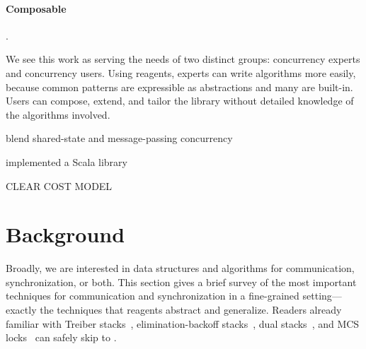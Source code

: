 \documentclass[preprint]{sigplanconf}
\begin{document}
\paragraph{Composable} .

We see this work as serving the needs of two distinct groups: concurrency
experts and concurrency users.  Using reagents, experts can write algorithms
more easily, because common patterns are expressible as abstractions and many
are built-in.  Users can compose, extend, and tailor the library without
detailed knowledge of the algorithms involved.

blend shared-state and message-passing concurrency

implemented a Scala library

CLEAR COST MODEL


\section{Background}
\label{sec:background}

\cite{Shavit1997a} %

Broadly, we are interested in data structures and algorithms for
communication, synchronization, or both.  This section gives a brief survey of
the most important techniques for communication and synchronization in a
fine-grained setting---exactly the techniques that reagents abstract and
generalize.  Readers already familiar with Treiber stacks~\cite{Treiber1986},
elimination-backoff stacks~\cite{Hendler2004}, dual stacks~\cite{Scherer2004},
and MCS locks~\cite{Mellor-Crummey1991} can safely skip to .
\end{document}
